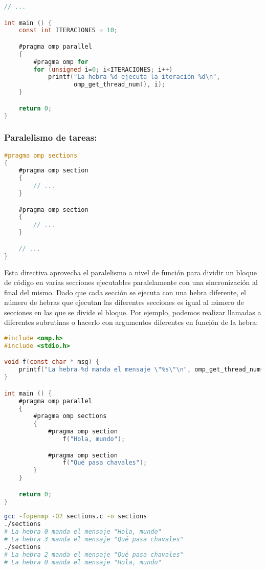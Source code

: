 \begin{lstlisting}[language=C]
// ...

int main () {
	const int ITERACIONES = 10;

	#pragma omp parallel
	{
		#pragma omp for
		for (unsigned i=0; i<ITERACIONES; i++)
			printf("La hebra %d ejecuta la iteración %d\n",
			       omp_get_thread_num(), i);
	}

	return 0;
}
\end{lstlisting}

\subsubsection{Paralelismo de tareas: }

\begin{lstlisting}[language=C]
#pragma omp sections
{
	#pragma omp section
	{
		// ...
	}

	#pragma omp section
	{
		// ...
	}

	// ...
}
\end{lstlisting}

Esta directiva aprovecha el paralelismo a nivel de función para dividir un bloque de código en varias secciones ejecutables paralelamente con una sincronización al final del mismo.
Dado que cada sección se ejecuta con una hebra diferente, el número de hebras que ejecutan las diferentes secciones es igual al número de secciones en las que se divide el bloque.
Por ejemplo, podemos realizar llamadas a diferentes subrutinas o hacerlo con argumentos diferentes en función de la hebra:

\begin{lstlisting}[language=C]
#include <omp.h>
#include <stdio.h>

void f(const char * msg) {
	printf("La hebra %d manda el mensaje \"%s\"\n", omp_get_thread_num(), msg);
}

int main () {
	#pragma omp parallel
	{
		#pragma omp sections
		{
			#pragma omp section
				f("Hola, mundo");

			#pragma omp section
				f("Qué pasa chavales");
		}
	}

	return 0;
}
\end{lstlisting}

\begin{lstlisting}[language=sh]
gcc -fopenmp -O2 sections.c -o sections
./sections
# La hebra 0 manda el mensaje "Hola, mundo"
# La hebra 3 manda el mensaje "Qué pasa chavales"
./sections
# La hebra 2 manda el mensaje "Qué pasa chavales"
# La hebra 0 manda el mensaje "Hola, mundo"
\end{lstlisting}

